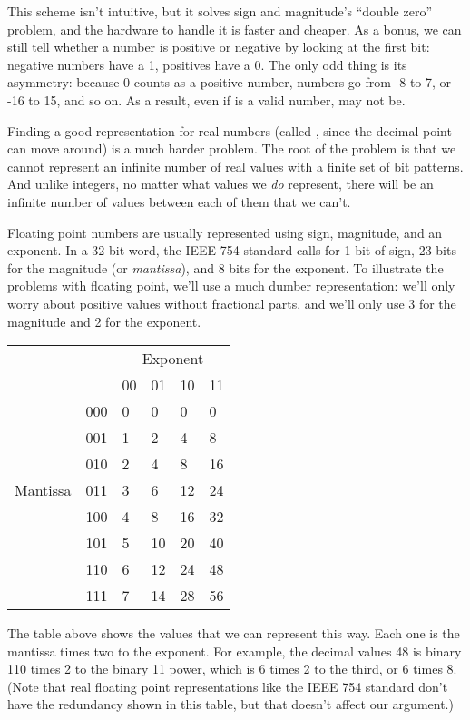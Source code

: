 This scheme isn't intuitive, but it solves sign and magnitude's ``double
zero'' problem, and the hardware to handle it is faster and cheaper. As
a bonus, we can still tell whether a number is positive or negative by
looking at the first bit: negative numbers have a 1, positives have a 0.
The only odd thing is its asymmetry: because 0 counts as a positive
number, numbers go from -8 to 7, or -16 to 15, and so on. As a result,
even if  is a valid number,  may not be.

Finding a good representation for real numbers (called
, since the decimal
point can move around) is a much harder problem. The root of the problem
is that we cannot represent an infinite number of real values with a
finite set of bit patterns. And unlike integers, no matter what values
we \emph{do} represent, there will be an infinite number of values
between each of them that we can't.

Floating point numbers are usually represented using sign, magnitude,
and an exponent. In a 32-bit word, the IEEE 754 standard calls for 1 bit
of sign, 23 bits for the magnitude (or \emph{mantissa}), and 8 bits for
the exponent. To illustrate the problems with floating point, we'll use
a much dumber representation: we'll only worry about positive values
without fractional parts, and we'll only use 3 for the magnitude and 2
for the exponent.

\begin{tabular}{llllll}
         &     & \multicolumn{4}{c}{Exponent} \\
         &     & 00 & 01 & 10 & 11 \\
         & 000 &  0 &  0 &  0 &  0 \\
         & 001 &  1 &  2 &  4 &  8 \\
         & 010 &  2 &  4 &  8 & 16 \\
Mantissa & 011 &  3 &  6 & 12 & 24 \\
         & 100 &  4 &  8 & 16 & 32 \\
         & 101 &  5 & 10 & 20 & 40 \\
         & 110 &  6 & 12 & 24 & 48 \\
         & 111 &  7 & 14 & 28 & 56 \\
\end{tabular}

The table above shows the values that we can represent this way. Each
one is the mantissa times two to the exponent. For example, the decimal
values 48 is binary 110 times 2 to the binary 11 power, which is 6 times
2 to the third, or 6 times 8. (Note that real floating point
representations like the IEEE 754 standard don't have the redundancy
shown in this table, but that doesn't affect our argument.)

